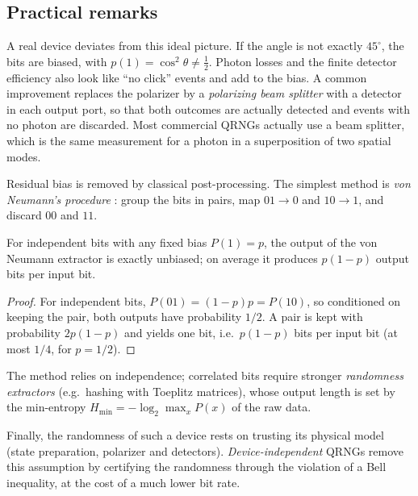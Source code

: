 \subsection{Practical remarks}
A real device deviates from this ideal picture. If the angle is not exactly $45^\circ$, the bits are biased, with $p(1)=\cos^2\theta\neq\frac12$.
Photon losses and the finite detector efficiency also look like ``no click'' events and add to the bias. A common improvement replaces the
polarizer by a \emph{polarizing beam splitter} with a detector in each output port, so that both outcomes are actually detected and events with no
photon are discarded. Most commercial QRNGs actually use a beam splitter, which is the same measurement for a photon in a superposition of two
spatial modes.

Residual bias is removed by classical post-processing. The simplest method is \emph{von Neumann's procedure} \cite{vonNeumann1951}: group the bits
in pairs, map $01\to0$ and $10\to1$, and discard $00$ and $11$.
\begin{proposition}
For independent bits with any fixed bias $P(1)=p$, the output of the von Neumann extractor is exactly unbiased; on average it produces
$p(1-p)$ output bits per input bit.
\end{proposition}
\begin{proof}
For independent bits, $P(01)=(1-p)p=P(10)$, so conditioned on keeping the pair, both outputs have probability $1/2$. A pair is kept with
probability $2p(1-p)$ and yields one bit, i.e.\ $p(1-p)$ bits per input bit (at most $1/4$, for $p=1/2$).
\end{proof}
The method relies on independence; correlated bits require stronger \emph{randomness extractors} (e.g.\ hashing with Toeplitz matrices), whose
output length is set by the min-entropy $H_{\min}=-\log_2\max_xP(x)$ of the raw data.

Finally, the randomness of such a device rests on trusting its physical model (state preparation, polarizer and detectors). \emph{Device-independent}
QRNGs remove this assumption by certifying the randomness through the violation of a Bell inequality, at the cost of a much lower bit rate.

